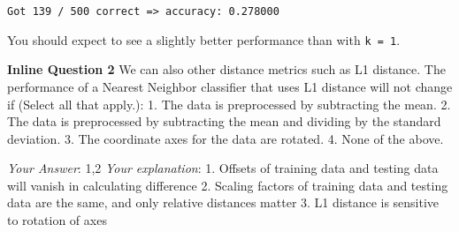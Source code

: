 \documentclass[11pt]{article}
\begin{document}
    \begin{Verbatim}[commandchars=\\\{\}]
Got 139 / 500 correct => accuracy: 0.278000

    \end{Verbatim}

    You should expect to see a slightly better performance than with
\texttt{k\ =\ 1}.

    \textbf{Inline Question 2} We can also other distance metrics such as L1
distance. The performance of a Nearest Neighbor classifier that uses L1
distance will not change if (Select all that apply.): 1. The data is
preprocessed by subtracting the mean. 2. The data is preprocessed by
subtracting the mean and dividing by the standard deviation. 3. The
coordinate axes for the data are rotated. 4. None of the above.

\emph{Your Answer}: 1,2 \emph{Your explanation}: 1. Offsets of training
data and testing data will vanish in calculating difference 2. Scaling
factors of training data and testing data are the same, and only
relative distances matter 3. L1 distance is sensitive to rotation of
axes
\end{document}
